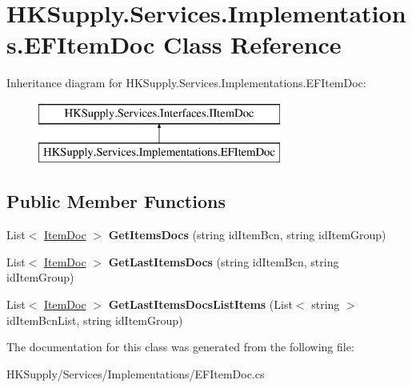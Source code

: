 \hypertarget{class_h_k_supply_1_1_services_1_1_implementations_1_1_e_f_item_doc}{}\section{H\+K\+Supply.\+Services.\+Implementations.\+E\+F\+Item\+Doc Class Reference}
\label{class_h_k_supply_1_1_services_1_1_implementations_1_1_e_f_item_doc}
Inheritance diagram for H\+K\+Supply.\+Services.\+Implementations.\+E\+F\+Item\+Doc\+:\begin{figure}[H]
\begin{center}
\leavevmode
\includegraphics[height=2.000000cm]{class_h_k_supply_1_1_services_1_1_implementations_1_1_e_f_item_doc}
\end{center}
\end{figure}
\subsection*{Public Member Functions}
\begin{DoxyCompactItemize}
\item 
\mbox{\label{class_h_k_supply_1_1_services_1_1_implementations_1_1_e_f_item_doc_aec3d7ffc45c98fa81f21e0ed87d501cb}} 
List$<$ \mbox{\hyperlink{class_h_k_supply_1_1_models_1_1_item_doc}{Item\+Doc}} $>$ {\bfseries Get\+Items\+Docs} (string id\+Item\+Bcn, string id\+Item\+Group)
\item 
\mbox{\label{class_h_k_supply_1_1_services_1_1_implementations_1_1_e_f_item_doc_af3261ef59553fc16ce6a91685c44d64e}} 
List$<$ \mbox{\hyperlink{class_h_k_supply_1_1_models_1_1_item_doc}{Item\+Doc}} $>$ {\bfseries Get\+Last\+Items\+Docs} (string id\+Item\+Bcn, string id\+Item\+Group)
\item 
\mbox{\label{class_h_k_supply_1_1_services_1_1_implementations_1_1_e_f_item_doc_a115fe2b2d8389ca57c63222ab3a3645e}} 
List$<$ \mbox{\hyperlink{class_h_k_supply_1_1_models_1_1_item_doc}{Item\+Doc}} $>$ {\bfseries Get\+Last\+Items\+Docs\+List\+Items} (List$<$ string $>$ id\+Item\+Bcn\+List, string id\+Item\+Group)
\end{DoxyCompactItemize}


The documentation for this class was generated from the following file\+:\begin{DoxyCompactItemize}
\item 
H\+K\+Supply/\+Services/\+Implementations/E\+F\+Item\+Doc.\+cs\end{DoxyCompactItemize}
